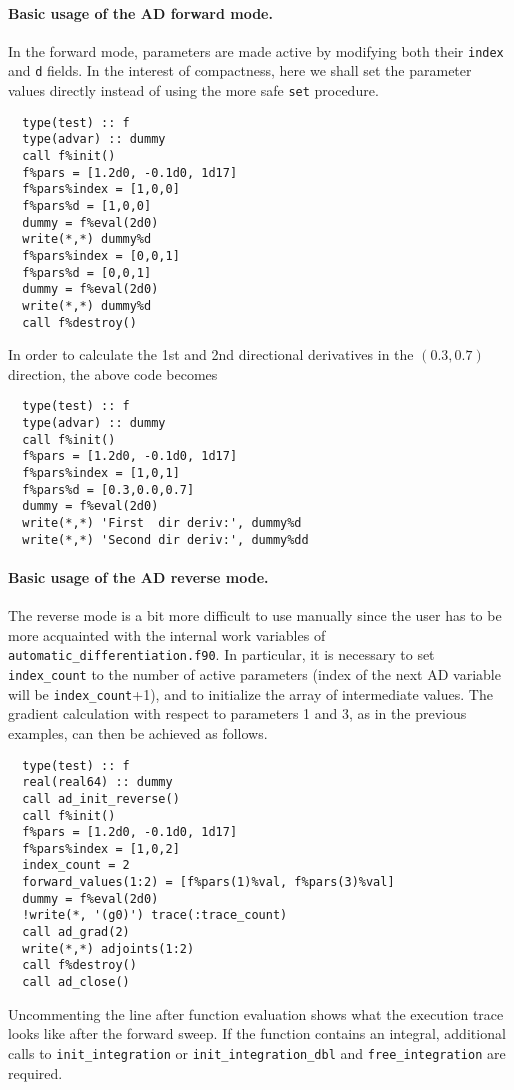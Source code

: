 \documentclass{article}
\begin{document}
\paragraph{Basic usage of the AD forward mode.} In the forward mode, parameters are made active by modifying both their \texttt{index} and \texttt{d} fields. In the interest of compactness, here we shall set the parameter values directly instead of using the more safe \texttt{set} procedure.
\begin{verbatim}
  type(test) :: f
  type(advar) :: dummy
  call f%init()
  f%pars = [1.2d0, -0.1d0, 1d17]
  f%pars%index = [1,0,0]
  f%pars%d = [1,0,0]
  dummy = f%eval(2d0)
  write(*,*) dummy%d
  f%pars%index = [0,0,1]
  f%pars%d = [0,0,1]
  dummy = f%eval(2d0)
  write(*,*) dummy%d
  call f%destroy()
\end{verbatim}
In order to calculate the 1st and 2nd directional derivatives in the $(0.3,0.7)$ direction, the above code becomes
\begin{verbatim}
  type(test) :: f
  type(advar) :: dummy
  call f%init()
  f%pars = [1.2d0, -0.1d0, 1d17]
  f%pars%index = [1,0,1]
  f%pars%d = [0.3,0.0,0.7]
  dummy = f%eval(2d0)
  write(*,*) 'First  dir deriv:', dummy%d
  write(*,*) 'Second dir deriv:', dummy%dd
\end{verbatim}

\paragraph{Basic usage of the AD reverse mode.} The reverse mode is a bit more difficult to use manually since the user has to be more acquainted with the internal work variables of \verb+automatic_differentiation.f90+. In particular, it is necessary to set \verb+index_count+ to the number of active parameters (index of the next AD variable will be \verb+index_count++1), and to initialize the array of intermediate values. The gradient calculation with respect to parameters 1 and 3, as in the previous examples, can then be achieved as follows.
\begin{verbatim}
  type(test) :: f
  real(real64) :: dummy
  call ad_init_reverse()
  call f%init()
  f%pars = [1.2d0, -0.1d0, 1d17]
  f%pars%index = [1,0,2]
  index_count = 2
  forward_values(1:2) = [f%pars(1)%val, f%pars(3)%val]
  dummy = f%eval(2d0)
  !write(*, '(g0)') trace(:trace_count)
  call ad_grad(2)
  write(*,*) adjoints(1:2)
  call f%destroy()
  call ad_close()
\end{verbatim}
Uncommenting the line after function evaluation shows what the execution trace looks like after the forward sweep. If the function contains an integral, additional calls to \verb+init_integration+ or \verb+init_integration_dbl+ and \verb+free_integration+ are required.
\end{document}
